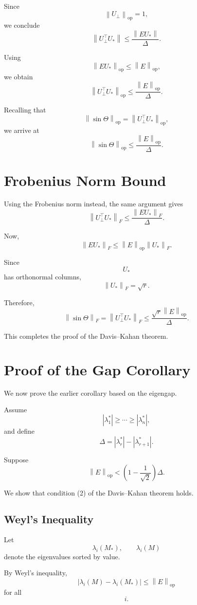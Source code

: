 \documentclass[12pt,oneside]{book}
\numberwithin{equation}{section}
\theoremstyle{definition}
\theoremstyle{plain}
\theoremstyle{remark}
\newcommand{\norm}[1]{\left\lVert #1 \right\rVert}
\begin{document}
Since
\[
\norm{U_\perp}_{\mathrm{op}}=1,
\]
we conclude
\[
\norm{U_\perp^\top U_*}
\leq
\frac{\norm{EU_*}}{\Delta}.
\]

Using
\[
\norm{EU_*}_{\mathrm{op}}
\leq
\norm{E}_{\mathrm{op}},
\]
we obtain
\[
\norm{U_\perp^\top U_*}_{\mathrm{op}}
\leq
\frac{\norm{E}_{\mathrm{op}}}{\Delta}.
\]

Recalling that
\[
\norm{\sin\Theta}_{\mathrm{op}}
=
\norm{U_\perp^\top U_*}_{\mathrm{op}},
\]
we arrive at
\[
\norm{\sin\Theta}_{\mathrm{op}}
\leq
\frac{\norm{E}_{\mathrm{op}}}{\Delta}.
\]

\section{Frobenius Norm Bound}

Using the Frobenius norm instead, the same argument gives
\[
\norm{U_\perp^\top U_*}_F
\leq
\frac{\norm{EU_*}_F}{\Delta}.
\]

Now,
\[
\norm{EU_*}_F
\leq
\norm{E}_{\mathrm{op}}
\norm{U_*}_F.
\]

Since
\[
U_*
\]
has orthonormal columns,
\[
\norm{U_*}_F=\sqrt{r}.
\]

Therefore,
\[
\norm{\sin\Theta}_F
=
\norm{U_\perp^\top U_*}_F
\leq
\frac{\sqrt{r}\norm{E}_{\mathrm{op}}}{\Delta}.
\]

This completes the proof of the Davis--Kahan theorem.

\section{Proof of the Gap Corollary}

We now prove the earlier corollary based on the eigengap.

Assume
\[
|\lambda_1^*|
\geq
\cdots
\geq
|\lambda_n^*|,
\]
and define
\[
\Delta
=
|\lambda_r^*|-|\lambda_{r+1}^*|.
\]

Suppose
\[
\norm{E}_{\mathrm{op}}
<
\left(
1-\frac{1}{\sqrt{2}}
\right)\Delta.
\]

We show that condition (2) of the Davis--Kahan theorem holds.

\subsection{Weyl's Inequality}

Let
\[
\lambda_i(M_*),
\qquad
\lambda_i(M)
\]
denote the eigenvalues sorted by value.

By Weyl's inequality,
\[
|\lambda_i(M)-\lambda_i(M_*)|
\leq
\norm{E}_{\mathrm{op}}
\]
for all
\[
i.
\]
\end{document}
